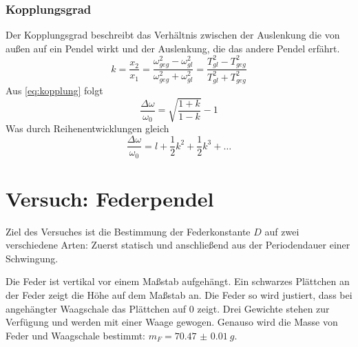 \subsubsection{Kopplungsgrad}
Der Kopplungsgrad beschreibt das Verhältnis zwischen der Auslenkung die von außen auf ein Pendel wirkt und der Auslenkung, die das andere Pendel erfährt.
\begin{equation}
k=\frac{x_2}{x_1}=\frac{\omega_{geg}^2-\omega_{gl}^2}{\omega_{geg}^2+\omega_{gl}^2}=\frac{T_{gl}^2-T_{geg}^2}{T_{gl}^2+T_{geg}^2}
\label{eq:kopplung}
\end{equation}
Aus \ref{eq:kopplung} folgt
\begin{equation}
\frac{\Delta \omega}{\omega_0}=\sqrt{\frac{1+k}{1-k}}-1
\label{eq:frequenzspalt}
\end{equation}
Was durch Reihenentwicklungen gleich
\begin{equation}
\frac{\Delta \omega}{\omega_0}= l+\frac{1}{2}k^2+\frac{1}{2}k^3+\dots
\label{eq:3ordnung}
\end{equation}
\section{Versuch: Federpendel}
Ziel des Versuches ist die Bestimmung der Federkonstante $D$ auf zwei verschiedene Arten: Zuerst statisch und anschließend aus der Periodendauer einer Schwingung.

Die Feder ist vertikal vor einem Maßstab aufgehängt. Ein schwarzes Plättchen an der Feder zeigt die Höhe auf dem Maßstab an. Die Feder so wird justiert, dass bei angehängter Waagschale das Plättchen auf 0 zeigt. Drei Gewichte stehen zur Verfügung und werden mit einer Waage gewogen.
Genauso wird die Masse von Feder und Waagschale bestimmt: $m_F=\SI{70.47(1)}{g}$.

